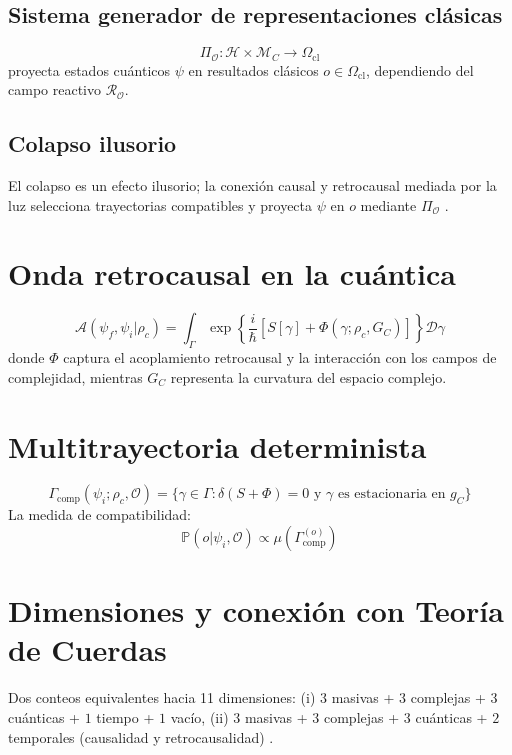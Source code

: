 \documentclass[reprint,amsmath,amssymb,aps]{revtex4-2}
\begin{document}
\subsection{Sistema generador de representaciones clásicas}
\begin{equation}
\Pi_{\mathcal{O}}: \mathcal{H} \times \mathcal{M}_C \to \Omega_{\text{cl}}
\end{equation}
proyecta estados cuánticos $\psi$ en resultados clásicos $o \in \Omega_{\text{cl}}$, dependiendo del campo reactivo $\mathcal{R}_\mathcal{O}$.

\subsection{Colapso ilusorio}
El colapso es un efecto ilusorio; la conexión causal y retrocausal mediada por la luz selecciona trayectorias compatibles y proyecta $\psi$ en $o$ mediante $\Pi_{\mathcal{O}}$ \cite{Cramer1986, Aharonov1964}.

\section{Onda retrocausal en la cuántica}
\begin{equation}
\mathcal{A}(\psi_f, \psi_i|\rho_c) = \int_{\Gamma} \exp\left\{\frac{i}{\hbar}\left[S[\gamma] + \Phi(\gamma;\rho_c,G_C)\right]\right\} \mathcal{D}\gamma
\end{equation}
donde $\Phi$ captura el acoplamiento retrocausal y la interacción con los campos de complejidad, mientras $G_C$ representa la curvatura del espacio complejo.

\section{Multitrayectoria determinista}
\begin{equation}
\Gamma_{\text{comp}}(\psi_i;\rho_c, \mathcal{O}) = \{\gamma \in \Gamma : \delta (S+\Phi)=0 \text{ y }\gamma \text{ es estacionaria en } g_C \}
\end{equation}
La medida de compatibilidad:
\begin{equation}
\mathbb{P}(o|\psi_i,\mathcal{O}) \propto \mu(\Gamma_{\text{comp}}^{(o)})
\end{equation}

\section{Dimensiones y conexión con Teoría de Cuerdas}
Dos conteos equivalentes hacia 11 dimensiones:  
(i) $3$ masivas + $3$ complejas + $3$ cuánticas + $1$ tiempo + $1$ vacío,  
(ii) $3$ masivas + $3$ complejas + $3$ cuánticas + $2$ temporales (causalidad y retrocausalidad) \cite{Greene2000, Penrose2004}.
\end{document}
